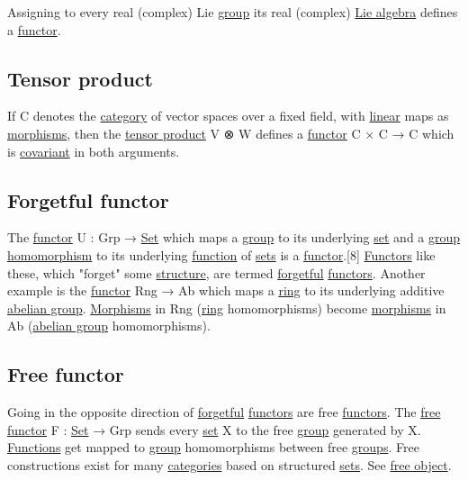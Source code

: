 \documentclass[11pt]{article}
\begin{document}
Assigning to every real (complex) Lie \hyperref[orgc937439]{group} its real (complex) \hyperref[org8a581cf]{Lie algebra} defines a \hyperref[orgf2f6841]{functor}.\\

\subsection{\label{org80f58ae}Tensor product}
\label{sec:orgb069f47}

If C denotes the \hyperref[org0450535]{category} of vector spaces over a fixed field, with \hyperref[orgbbe89e9]{linear} maps as \hyperref[org6c2fa5c]{morphisms}, then the \hyperref[org80f58ae]{tensor product} V ⊗ W defines a \hyperref[orgf2f6841]{functor} C × C → C which is \hyperref[org71a3b16]{covariant} in both arguments.\\

\subsection{\label{org1efd0da}Forgetful functor}
\label{sec:orge770b5a}

The \hyperref[orgf2f6841]{functor} U : Grp → \hyperref[org1faf06d]{Set} which maps a \hyperref[orgc937439]{group} to its underlying \hyperref[org1faf06d]{set} and a \hyperref[orgc937439]{group} \hyperref[org4991058]{homomorphism} to its underlying \hyperref[orge15bc14]{function} of \hyperref[org58ec608]{sets} is a \hyperref[orgf2f6841]{functor}.[8] \hyperref[orgdd21ed6]{Functors} like these, which "forget" some \hyperref[org8051f61]{structure}, are termed \hyperref[org8231345]{forgetful} \hyperref[orgdd21ed6]{functors}. Another example is the \hyperref[orgf2f6841]{functor} Rng → Ab which maps a \hyperref[orgce31c9f]{ring} to its underlying additive \hyperref[org1992f6e]{abelian group}. \hyperref[org6c2fa5c]{Morphisms} in Rng (\hyperref[orgce31c9f]{ring} homomorphisms) become \hyperref[org6c2fa5c]{morphisms} in Ab (\hyperref[org1992f6e]{abelian group} homomorphisms).\\

\subsection{\label{orgc0f34bb}Free functor}
\label{sec:org675579e}

Going in the opposite direction of \hyperref[org8231345]{forgetful} \hyperref[orgdd21ed6]{functors} are free \hyperref[orgdd21ed6]{functors}. The \hyperref[orgc0f34bb]{free functor} F : \hyperref[org1faf06d]{Set} → Grp sends every \hyperref[org1faf06d]{set} X to the free \hyperref[orgc937439]{group} generated by X. \hyperref[orgaa8fb87]{Functions} get mapped to \hyperref[orgc937439]{group} homomorphisms between free \hyperref[org734e757]{groups}. Free constructions exist for many \hyperref[org2f49b91]{categories} based on structured \hyperref[org58ec608]{sets}. See \hyperref[org3f07e08]{free object}.\\
\end{document}
